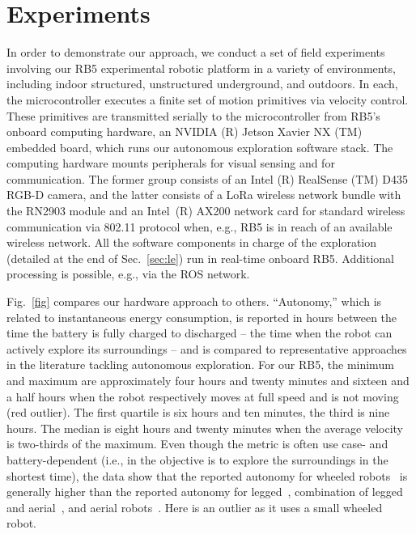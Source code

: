 \documentclass[letterpaper,10pt,conference,twoside]{IEEEtran}
\theoremstyle{definition}
\begin{document}
\section{Experiments}
\label{sec:fe}
\noindent
In order to demonstrate %
our approach, we conduct a set of 
field experiments %
involving our RB5 experimental robotic platform %
in a variety of environments, including indoor structured, unstructured underground, and outdoors. In each, the microcontroller executes a finite set of motion primitives via velocity control. These primitives are transmitted serially to the microcontroller 
from RB5's onboard computing hardware, an NVIDIA (R) Jetson Xavier NX (TM) embedded board, which runs our autonomous %
exploration software stack. %
The computing hardware mounts peripherals for visual sensing and for communication. The former group consists of %
an Intel (R) RealSense (TM) D435 RGB-D camera, and the latter 
consists 
of a LoRa wireless network bundle with the RN2903 module and an Intel~(R) AX200 network card for standard wireless communication via 802.11 protocol when, e.g., RB5 is in reach of an available wireless network.
%
All the software components in charge of the exploration %
(detailed at the end of Sec.~\ref{sec:le}) run in real-time onboard RB5. Additional processing is possible, e.g., %
via the ROS network.

Fig.~\ref{fig} compares our hardware approach to others. 
``Autonomy,'' which is related to instantaneous energy consumption, is reported in hours between the time the battery is fully charged to discharged -- the time when the robot can actively explore its surroundings -- and is compared to representative approaches in the literature tackling autonomous exploration. For our RB5, the minimum and maximum are approximately four hours and twenty minutes and sixteen and a half hours when the robot respectively moves at full speed and is not moving (red outlier). The first quartile is six hours and ten minutes, the third is nine hours. The median is eight hours and twenty minutes when the average velocity is two-thirds of the maximum. Even though the metric is often use case- and battery-dependent (i.e., in \cite{roucek2020darpa,tranzatto2022cerberus} the objective is to explore the surroundings in the shortest time), the data show that the reported autonomy for wheeled robots~\cite{roucek2020darpa,surmann2003autonomous} is generally higher than the reported autonomy for legged~\cite{tranzatto2022cerberus}, combination of legged and aerial~\cite{kulkarni2022autonomous}, and aerial robots~\cite{schmid2020efficient}.
Here \cite{muller2021openbot} is an outlier as it uses a small wheeled robot.
\end{document}
